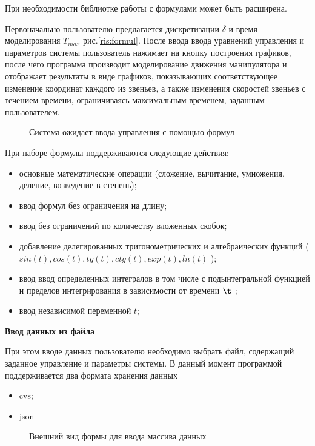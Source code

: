 При необходимости библиотке работы с формулами может быть расширена.

Первоначально пользователю предлагается дискретизации $\delta$  и время моделирования  $T_{max}$ рис.\eqref{ris:formul}. После ввода ввода уравнений управления и параметров системы пользователь нажимает на кнопку построения графиков, после чего программа производит моделирование движения манипулятора и отображает результаты в виде графиков, показывающих соответствующее изменение координат каждого из звеньев, а также изменения скоростей звеньев с течением времени, ограничиваясь максимальным временем, заданным пользователем.

\begin{figure}[h]
\caption{Система ожидает ввода управления с помощью формул}
\label{ris:formul}
\end{figure}

При наборе формулы поддерживаются следующие действия:
\begin{itemize}
\item{основные математические операции (сложение, вычитание, умножения, деление, возведение в степень);}
\item{ввод формул без ограничения на длину;}
\item{ввод без ограничений по количеству вложенных скобок;}
\item{добавление делегированных тригонометрических и алгебраических функций ($sin(t), cos(t), tg(t), ctg(t), exp(t), ln(t)$ );}
\item{ввод ввод определенных интегралов в том числе с подынтегральной функцией и пределов интегрирования в зависимости от времени $\t$ ;}
\item{ввод независимой переменной $t$;}
\end{itemize}

\textbf{Ввод данных из файла}

При этом вводе данных пользователю необходимо выбрать файл, содержащий заданное управление и параметры системы. В данный момент программой поддерживается два формата хранения данных

\begin{itemize}
\item{cvs;}
\item{json}
\end{itemize}

\begin{figure}[h]
\caption{Внешний вид формы для ввода массива данных}
\label{ris:mass}
\end{figure}

